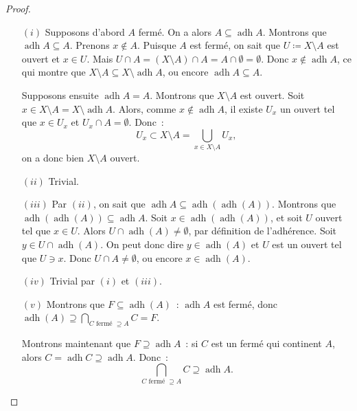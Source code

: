 \documentclass{report}
\theoremstyle{definition}
\theoremstyle{remark}
\DeclareMathOperator{\adh}{adh}
\begin{document}
		\begin{proof}~
		\begin{itemize}
			\item[$(i)$] Supposons d'abord $A$ fermé. On a alors $A \subseteq \adh A$. Montrons que $\adh A \subseteq A$. Prenons $x \not \in A$. Puisque $A$
			est fermé, on sait que $U \coloneqq X \setminus A$ est ouvert et $x \in U$. Mais $U \cap A = (X \setminus A) \cap A = A \cap \emptyset = \emptyset$.
			Donc $x \not \in \adh A$, ce qui montre que $X \setminus A \subseteq X \setminus \adh A$, ou encore $\adh A \subseteq A$.

			Supposons ensuite $\adh A = A$. Montrons que $X \setminus A$ est ouvert. Soit $x \in X \setminus A = X \setminus \adh A$. Alors, comme
			$x \not \in \adh A$, il existe $U_x$ un ouvert tel que $x \in U_x$ et $U_x \cap A = \emptyset$. Donc~:
			\[U_x \subset X \setminus A = \bigcup_{x \in X \setminus A}U_x,\]
			on a donc bien $X \setminus A$ ouvert.

			\item[$(ii)$] Trivial.
			\item[$(iii)$] Par $(ii)$, on sait que $\adh A \subseteq \adh(\adh(A))$. Montrons que $\adh(\adh(A)) \subseteq \adh A$. Soit $x \in \adh(\adh(A))$,
			et soit $U$ ouvert tel que $x \in U$. Alors $U \cap \adh(A) \neq \emptyset$, par définition de l'adhérence. Soit $y \in U \cap \adh(A)$. On peut
			donc dire $y \in \adh(A)$ et $U$ est un ouvert tel que $U \ni x$. Donc $U \cap A \neq \emptyset$, ou encore $x \in \adh(A)$.

			\item[$(iv)$] Trivial par $(i)$ et $(iii)$.
			\item[$(v)$] Montrons que $F \subseteq \adh(A)$~: $\adh A$ est fermé, donc $\adh(A) \supseteq \bigcap_{C \text{ fermé } \supseteq A}C = F$.

			Montrons maintenant que $F \supseteq \adh A$~: si $C$ est un fermé qui continent $A$, alors $C = \adh C \supseteq \adh A$. Donc~:
			\[\bigcap_{C \text{ fermé } \supseteq A}C \supseteq \adh A.\]
		\end{itemize}
		\end{proof}
\end{document}
